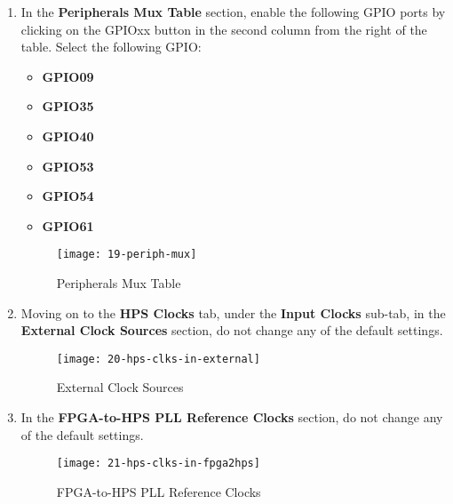 \begin{flushleft}
\begin{enumerate}[
	label=\textbf{Step \arabic*.},
	leftmargin=*,
	widest={00},
	align=left]
\item In the \textbf{Peripherals Mux Table} section, enable the following GPIO ports by clicking on the GPIOxx button in the second column from the right of the table.  Select the following GPIO:

\begin{itemize}

\item \textbf{GPIO09}

\item \textbf{GPIO35}

\item \textbf{GPIO40}

\item \textbf{GPIO53}

\item \textbf{GPIO54}

\item \textbf{GPIO61}

\end{itemize}

\begin{figure}[H]
\centering
\texttt{[image: 19-periph-mux]}
\caption{Peripherals Mux Table}
\label{fig:19-periph-mux}
\end{figure}

\item Moving on to the \textbf{HPS Clocks} tab, under the \textbf{Input Clocks} sub-tab, in the \textbf{External Clock Sources} section, do not change any of the default settings.

\begin{figure}[H]
\centering
\texttt{[image: 20-hps-clks-in-external]}
\caption{External Clock Sources}
\label{fig:20-hps-clks-in-external}
\end{figure}

\item In the \textbf{FPGA-to-HPS PLL Reference Clocks} section, do not change any of the default settings.

\begin{figure}[H]
\centering
\texttt{[image: 21-hps-clks-in-fpga2hps]}
\caption{FPGA-to-HPS PLL Reference Clocks}
\label{fig:21-hps-clks-in-fpga2hps}
\end{figure}


\end{enumerate}
\end{flushleft}
